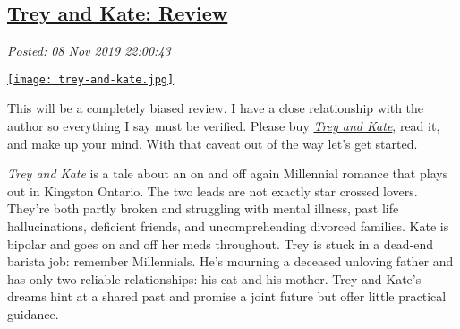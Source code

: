 %

\subsection*{\href{https://analyzethedatanotthedrivel.org/2019/11/08/trey-and-kate-review/}{Trey and Kate: Review}}


\noindent\emph{Posted: 08 Nov 2019 22:00:43}
\vspace{6pt}


\captionsetup[floatingfigure]{labelformat=empty}
\begin{floatingfigure}[l]{0.25\textwidth}
\centering
\href{https://www.amazon.com/gp/product/1687011508/ref=x_gr_w_bb_glide_sout?ie=UTF8\&tag=x_gr_w_bb_glide_sout-20\&linkCode=as2\&camp=1789\&creative=9325\&creativeASIN=1687011508\&SubscriptionId=1MGPYB6YW3HWK55XCGG2}{\texttt{[image: trey-and-kate.jpg]}}
\label{fig:5625x0}
\end{floatingfigure}

This will be a completely biased review.
I have a close relationship with the author so 
everything I say must be verified. Please buy \emph{\href{https://www.amazon.com/gp/product/1687011508/ref=x_gr_w_bb_glide_sout?ie=UTF8\&tag=x_gr_w_bb_glide_sout-20\&linkCode=as2\&camp=1789\&creative=9325\&creativeASIN=1687011508\&SubscriptionId=1MGPYB6YW3HWK55XCGG2}{Trey
and Kate}}, read it, and make up your mind. With that
caveat out of the way let's get started.

\emph{Trey and Kate} is a tale about an on and off again Millennial
romance that plays out in Kingston Ontario. The two leads are not
exactly star crossed lovers. They're both partly broken and struggling
with mental illness, past life hallucinations, deficient friends, and
uncomprehending divorced families. Kate is bipolar and goes on and off
her meds throughout. Trey is stuck in a dead-end barista job: remember
Millennials. He's mourning a deceased unloving father and has only two
reliable relationships: his cat and his mother. Trey and Kate's dreams
hint at a shared past and promise a joint future but offer little
practical guidance.

